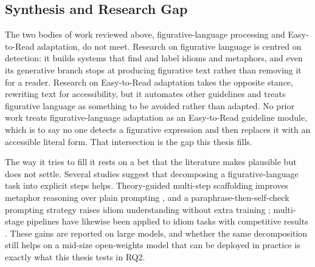 \subsection{Synthesis and Research Gap}
\label{sec:research-gap}

The two bodies of work reviewed above, figurative-language processing and
Easy-to-Read adaptation, do not meet. Research on figurative
language is centred on detection: it builds systems that find and label idioms
and metaphors, and even its generative branch stops at producing figurative
text rather than removing it for a reader. Research on Easy-to-Read adaptation
takes the opposite stance, rewriting text for accessibility, but it automates
other guidelines and treats figurative language as something to be avoided
rather than adapted. No prior work treats figurative-language adaptation as an
Easy-to-Read guideline module, which is to say no one detects a figurative
expression and then replaces it with an accessible literal form. That
intersection is the gap this thesis fills.

The way it tries to fill it rests on a bet that the literature makes plausible
but does not settle. Several studies suggest that decomposing a
figurative-language task into explicit steps helps. Theory-guided multi-step
scaffolding improves metaphor reasoning over plain prompting \cite{Tian2024},
and a paraphrase-then-self-check prompting strategy raises idiom understanding
without extra training \cite{Gao2025}; multi-stage pipelines have likewise been
applied to idiom tasks with competitive results \cite{Badran2025}. These gains
are reported on large models, and whether the same decomposition still helps on
a mid-size open-weights model that can be deployed in practice is exactly what this
thesis tests in RQ2.

